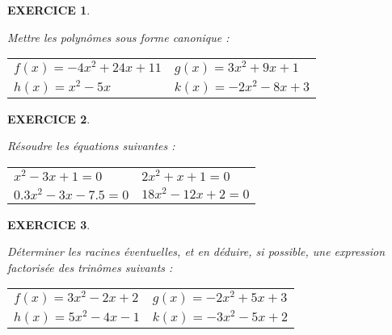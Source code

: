 \documentclass[a4paper]{article}   %
\renewcommand{\(}{\left(}
\renewcommand{\)}{\right)}
\newtheorem{EXO}{\large EXERCICE }
\newenvironment{EX}   { \setcounter{ques}{0} \begin{EXO} \hrulefill ~\vspace{0.3cm}

\normalfont}    {\end{EXO} \medskip}
\begin{document}
{\large{

\begin{EX} Mettre les polynômes sous forme canonique :

\begin{enumerate}
\renewcommand{\tabularxcolumn}[1]{b{#1}}
\begin{tabularx}{\linewidth}{XX}	
\item $f(x)=-4x^2 +24x+11$& 
\item $g(x)=3x^2+9x+1$ \\
\item $h(x)=x^2-5x$ &
\item $k(x)=-2x^2-8x+3$ \\
\end{tabularx}
\end{enumerate}


\end{EX}

\begin{EX} Résoudre les équations suivantes :
\begin{enumerate}
\renewcommand{\tabularxcolumn}[1]{b{#1}}
\begin{tabularx}{\linewidth}{XX}	
\item $x^2-3x+1=0$&
\item $2x^2+x+1=0$ \\
\item $0.3x^2-3x-7.5=0$&
\item $18x^2-12x+2=0$\\
\end{tabularx}
\end{enumerate}
\end{EX}

\begin{EX} Déterminer les racines éventuelles, et en déduire, si possible, une expression factorisée des trinômes suivants :
\begin{enumerate}
\renewcommand{\tabularxcolumn}[1]{b{#1}}
\begin{tabularx}{\linewidth}{XX}	
\item $f(x)=3x^2-2x+2$&
\item $g(x)=-2x^2+5x+3$\\
\item $h(x)=5x^2-4x-1$&
\item $k(x)=-3x^2-5x+2$\\
\end{tabularx}
\end{enumerate}
\end{EX}

}}
\end{document}
